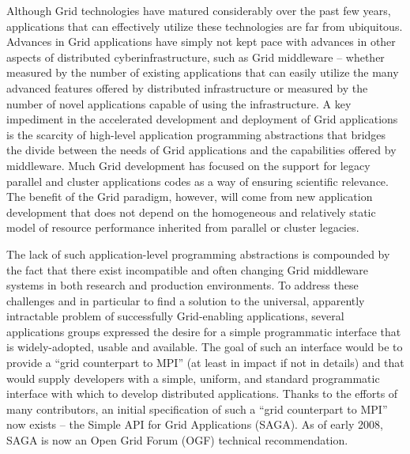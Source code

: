 \documentclass[a4paper,10pt]{article}
\begin{document}
Although Grid technologies have matured considerably over the past few years, applications that can effectively utilize these technologies are far from ubiquitous.  Advances in Grid applications have simply not kept pace with advances in other aspects of distributed cyberinfrastructure, such as Grid middleware -- whether measured by the number of existing applications that can easily utilize the many advanced features offered by distributed infrastructure or measured by the number of novel applications capable of using the infrastructure. A key impediment in the accelerated development and deployment of Grid applications is the scarcity of high-level application programming abstractions that bridges the divide between the needs of Grid applications and the capabilities offered by middleware.  Much Grid development has focused on the support for legacy parallel and cluster applications codes as a way of ensuring scientific relevance.  The benefit of the Grid paradigm, however, will come from new application development that does not depend on the homogeneous and relatively static model of resource performance inherited from parallel or cluster legacies.


The lack of such application-level programming abstractions is compounded by the fact that there exist incompatible and often changing Grid middleware systems in both research and production environments.  To address these challenges and in particular to find a solution to the universal, apparently intractable problem of successfully Grid-enabling applications, several applications groups expressed the desire for a simple programmatic interface that is widely-adopted, usable and available.  The goal of such an interface would be to provide a ``grid counterpart to MPI'' (at least in impact if not in details) and that would supply developers with a simple, uniform, and standard programmatic interface with which to develop distributed applications.  Thanks to the efforts of many contributors, an initial specification of such a ``grid counterpart to MPI'' now exists -- the Simple API for Grid Applications (SAGA). As of early 2008, SAGA is now an Open Grid Forum (OGF) technical recommendation.
\end{document}
